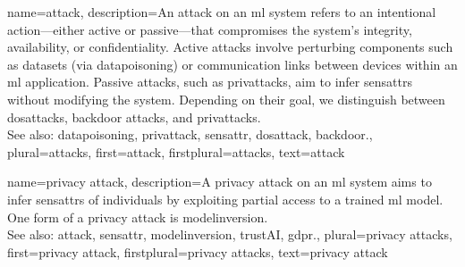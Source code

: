 {name={attack},  
	description={An attack on an \gls{ml} system refers to an intentional action—either 
		active or passive—that compromises the system's integrity, availability, or confidentiality. 
		Active attacks involve perturbing components such as \glspl{dataset} (via \gls{datapoisoning}) 
		or communication links between \glspl{device} within an \gls{ml} application. Passive attacks, 
		such as \glspl{privattack}, aim to infer \glspl{sensattr} without modifying the system. 
		Depending on their goal, we distinguish between \glspl{dosattack}, \gls{backdoor} attacks, and \glspl{privattack}.
		\\
		See also: \gls{datapoisoning}, \gls{privattack}, \gls{sensattr}, \gls{dosattack}, \gls{backdoor}.},
	plural={attacks}, 
	first={attack},
	firstplural={attacks},
	text={attack}
}

{name={privacy attack},
	description={A privacy \gls{attack} on an \gls{ml} system aims to infer 
		\glspl{sensattr} of individuals by exploiting partial access to a trained \gls{ml} \gls{model}. 
		One form of a privacy \gls{attack} is \gls{modelinversion}.\\
		See also: \gls{attack}, \gls{sensattr}, \gls{modelinversion}, \gls{trustAI}, \gls{gdpr}.},
	plural={privacy attacks}, 
	first={privacy attack},
	firstplural={privacy attacks}, 
	text={privacy attack}
}



